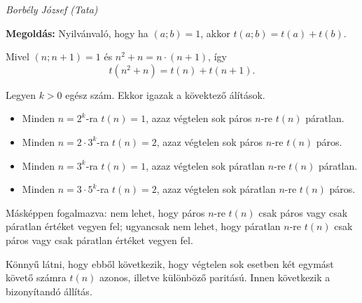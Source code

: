 \documentclass[a4paper,10pt]{article}
\newcommand{\ki}[2]{\hfill {\it #1 (#2)}\medskip}
\begin{document}
\ki{Borbély József}{Tata}\medskip

{\bf Megoldás: } Nyilvánvaló, hogy ha $(a;b)=1$, akkor $t(a;b)=t(a)+t(b)$.

Mivel $(n;n+1)=1$ és $n^2+n=n\cdot(n+1)$, így
\[t\left(n^2+n\right)=t(n)+t(n+1).\]

Legyen $k>0$ egész szám. Ekkor igazak a kövektező álítások.
\begin{itemize}
\item Minden $n=2^k$-ra $t(n)=1$, azaz végtelen sok páros $n$-re $t(n)$ páratlan.
\item Minden $n=2\cdot3^k$-ra $t(n)=2$, azaz végtelen sok páros $n$-re $t(n)$ páros.
\item Minden $n=3^k$-ra $t(n)=1$, azaz végtelen sok páratlan $n$-re $t(n)$ páratlan.
\item Minden $n=3\cdot5^k$-ra $t(n)=2$, azaz végtelen sok páratlan $n$-re $t(n)$ páros.
\end{itemize}

Másképpen fogalmazva: nem lehet, hogy páros $n$-re $t(n)$ csak páros vagy csak páratlan értéket vegyen fel; ugyancsak nem lehet, hogy páratlan $n$-re $t(n)$ csak páros vagy csak páratlan értéket vegyen fel.

Könnyű látni, hogy ebből következik, hogy végtelen sok esetben két egymást követő számra $t(n)$ azonos, illetve különböző paritású. Innen következik a bizonyítandó állítás.
\end{document}
